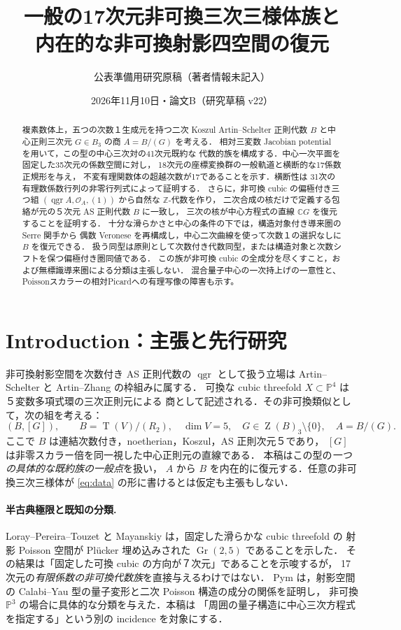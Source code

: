 \documentclass[11pt,a4paper]{ltjsarticle}
\title{一般の17次元非可換三次三様体族と\\内在的な非可換射影四空間の復元}
\author{公表準備用研究原稿（著者情報未記入）}
\date{2026年11月10日・論文B（研究草稿 v22）}
\numberwithin{equation}{section}
\newcommand{\C}{\mathbb C}
\newcommand{\PP}{\mathbb P}
\newcommand{\OO}{\mathcal O}
\newcommand{\qgr}{\operatorname{qgr}}
\newcommand{\Z}{\operatorname{Z}}
\newcommand{\Tens}{\operatorname{T}}
\begin{document}
\maketitle
\begin{abstract}
複素数体上，五つの次数１生成元を持つ二次 Koszul Artin--Schelter 正則代数
$B$ と中心正則三次元 $G\in B_3$ の商 $A=B/(G)$ を考える．
相対三変数 Jacobian potential を用いて，この型の中心三次対の41次元既約な
代数的族を構成する．中心一次平面を固定した35次元の係数空間に対し，
18次元の座標変換群の一般軌道と横断的な17係数正規形を与え，
不変有理関数体の超越次数が17であることを示す．横断性は
31次の有理数係数行列の非零行列式によって証明する．
さらに，非可換 cubic の偏極付き三つ組
$(\qgr A,\OO_A,(1))$ から自然な $\mathbb Z$-代数を作り，
二次合成の核だけで定義する包絡が元の５次元 AS 正則代数 $B$ に一致し，
三次の核が中心方程式の直線 $\C G$ を復元することを証明する．
十分な滑らかさと中心の条件の下では，構造対象付き導来圏の Serre 関手から
偶数 Veronese を再構成し，中心二次曲線を使って次数１の選択なしに $B$ を復元できる．
扱う同型は原則として次数付き代数同型，または構造対象と次数シフトを保つ偏極付き圏同値である．
この族が非可換 cubic の全成分を尽くすこと，および無標識導来圏による分類は主張しない．
混合量子中心の一次持上げの一意性と、Poissonスカラーの相対Picardへの有理写像の障害も示す。
\end{abstract}
\tableofcontents

\section{Introduction：主張と先行研究}\label{sec:intro}
非可換射影空間を次数付き AS 正則代数の $\qgr$ として扱う立場は
Artin--Schelter \cite{AS} と Artin--Zhang \cite{AZ} の枠組みに属する．
可換な cubic threefold $X\subset\PP^4$ は５変数多項式環の三次正則元による
商として記述される．その非可換類似として，次の組を考える：
\begin{equation}\label{eq:data}
 (B,[G]),\qquad B=\Tens(V)/(R_2),\quad\dim V=5,\quad
 G\in\Z(B)_3\setminus\{0\},\quad A=B/(G).
\end{equation}
ここで $B$ は連結次数付き，noetherian，Koszul，AS 正則次元５であり，
$[G]$ は非零スカラー倍を同一視した中心正則元の直線である．
本稿はこの型の\emph{一つの具体的な既約族の一般点}を扱い，
$A$ から $B$ を内在的に復元する．任意の非可換三次三様体が
\eqref{eq:data} の形に書けるとは仮定も主張もしない．

\paragraph{半古典極限と既知の分類.}
Loray--Pereira--Touzet \cite[Theorem~9.1]{LPT} と
Mayanskiy \cite[Theorem~1]{Mayanskiy} は，固定した滑らかな cubic threefold の
射影 Poisson 空間が Pl\"ucker 埋め込みされた $\operatorname{Gr}(2,5)$ であることを示した．
その結果は「固定した可換 cubic の方向が７次元」であることを示唆するが，
17次元の\emph{有限係数の非可換代数族}を直接与えるわけではない．
Pym \cite[Proposition~2.9, Theorem~2.10]{Pym} は，射影空間の
Calabi--Yau 型の量子変形と二次 Poisson 構造の成分の関係を証明し，
非可換 $\PP^3$ の場合に具体的な分類を与えた．本稿は
「周囲の量子構造に中心三次方程式を指定する」という別の incidence を対象にする．
\end{document}
